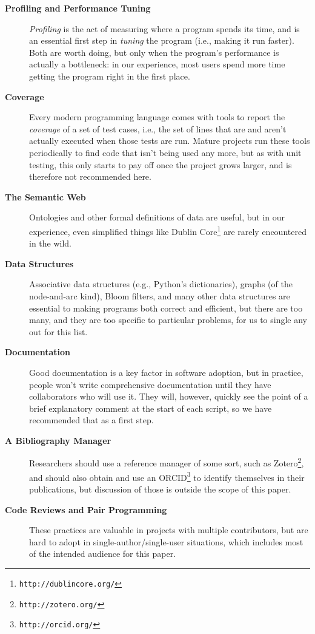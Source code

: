 \documentclass[10pt]{article}
\newcommand{\withurl}[2]{{#1}\footnote{\texttt{#2}}}
\begin{document}
\begin{description}
\item[\textbf{Profiling and Performance Tuning}]
\emph{Profiling} is the act of measuring where a program spends its
time, and is an essential first step in \emph{tuning} the program (i.e.,
making it run faster). Both are worth doing, but only when the program's
performance is actually a bottleneck: in our experience, most users
spend more time getting the program right in the first place.

\item[\textbf{Coverage}]
Every modern programming language comes with tools to report the
\emph{coverage} of a set of test cases, i.e., the set of lines that are
and aren't actually executed when those tests are run. Mature projects
run these tools periodically to find code that isn't being used any
more, but as with unit testing, this only starts to pay off once the
project grows larger, and is therefore not recommended here.

\item[\textbf{The Semantic Web}] Ontologies and other formal
  definitions of data are useful, but in our experience, even
  simplified things like \withurl{Dublin Core}{http://dublincore.org/}
  are rarely encountered in the wild.

\item[\textbf{Data Structures}]
Associative data structures (e.g., Python's dictionaries), graphs (of
the node-and-arc kind), Bloom filters, and many other data structures
are essential to making programs both correct and efficient, but there
are too many, and they are too specific to particular problems, for us
to single any out for this list.

\item[\textbf{Documentation}]
Good documentation is a key factor in software adoption, but in
practice, people won't write comprehensive documentation until they have
collaborators who will use it. They will, however, quickly see the point
of a brief explanatory comment at the start of each script, so we have
recommended that as a first step.

\item[\textbf{A Bibliography Manager}] Researchers should use a
  reference manager of some sort, such as
  \withurl{Zotero}{http://zotero.org/}, and should also obtain and use an
  \withurl{ORCID}{http://orcid.org/} to identify themselves in their
  publications, but discussion of those is outside the scope of this
  paper.

\item[\textbf{Code Reviews and Pair Programming}]
These practices are valuable in projects with multiple contributors, but
are hard to adopt in single-author/single-user situations, which
includes most of the intended audience for this paper.

\end{description}
\end{document}
